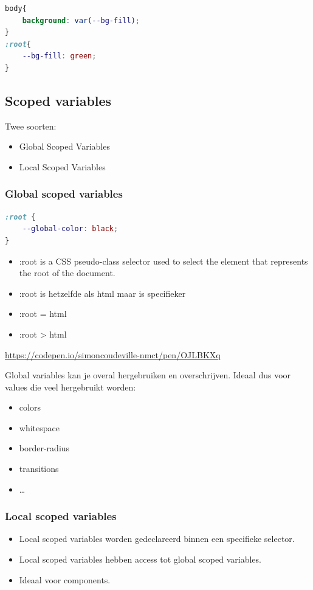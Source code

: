 \documentclass{article}
\begin{document}
\begin{lstlisting}[language=CSS]
body{
    background: var(--bg-fill);
}
:root{
    --bg-fill: green;
}

\end{lstlisting}

\subsection{Scoped variables}

Twee soorten:
\begin{itemize}
    \item Global Scoped Variables
    \item Local Scoped Variables
\end{itemize}

\subsubsection{Global scoped variables}

\begin{lstlisting}[language=CSS]
:root {
    --global-color: black;
}
\end{lstlisting}
\begin{itemize}
    \item :root is a CSS pseudo-class selector used to select the element that represents the root of the document.
    \item :root is hetzelfde als html maar is specifieker
    \item :root = html
    \item :root > html
\end{itemize}

\url{https://codepen.io/simoncoudeville-nmct/pen/OJLBKXq}

Global variables kan je overal hergebruiken en overschrijven. Ideaal dus voor values die veel hergebruikt worden:

\begin{itemize}
    \item colors
    \item whitespace
    \item border-radius
    \item transitions
    \item \dots
\end{itemize}

\subsubsection{Local scoped variables}
\begin{itemize}
    \item Local scoped variables worden gedeclareerd binnen een specifieke selector.
    \item Local scoped variables hebben access tot global scoped variables.
    \item Ideaal voor components.
\end{itemize}
\end{document}
